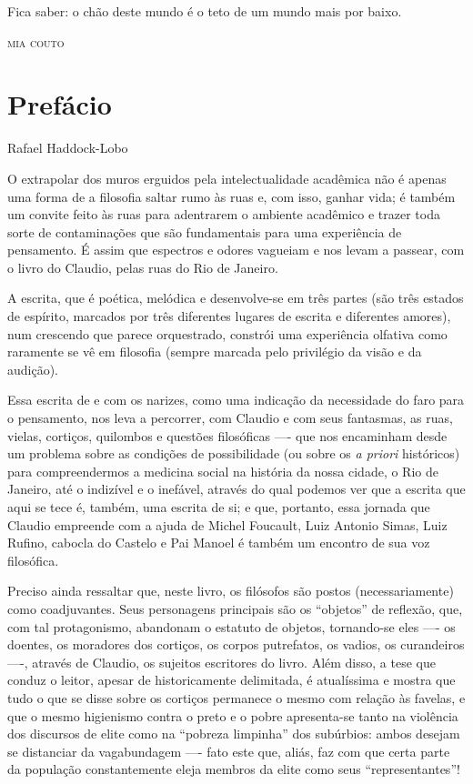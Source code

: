 \mbox{}
\thispagestyle{empty}
\vfill
\epigraph{Fica saber: o chão deste mundo é o teto de um mundo mais por baixo.}{\textsc{mia couto}}

\chapter{Prefácio}

\begin{flushright}
Rafael Haddock-Lobo
\end{flushright}

O extrapolar dos muros erguidos pela intelectualidade acadêmica não é
apenas uma forma de a filosofia saltar rumo às ruas e, com isso, ganhar
vida; é também um convite feito às ruas para adentrarem o ambiente
acadêmico e trazer toda sorte de contaminações que são fundamentais para
uma experiência de pensamento. É assim que espectros e odores vagueiam e
nos levam a passear, com o livro do Claudio, pelas ruas do Rio de
Janeiro.

A escrita, que é poética, melódica e desenvolve-se em três partes (são
três estados de espírito, marcados por três diferentes lugares de
escrita e diferentes amores), num crescendo que parece orquestrado,
constrói uma experiência olfativa como raramente se vê em filosofia
(sempre marcada pelo privilégio da visão e da audição).

Essa escrita de e com os narizes, como uma indicação da necessidade do
faro para o pensamento, nos leva a percorrer, com Claudio e com seus
fantasmas, as ruas, vielas, cortiços, quilombos e questões filosóficas
---- que nos encaminham desde um problema sobre as condições de
possibilidade (ou sobre os \textit{a priori} históricos) para
compreendermos a medicina social na história da nossa cidade, o Rio de
Janeiro, até o indizível e o inefável, através do qual podemos ver que a
escrita que aqui se tece é, também, uma escrita de si; e que, portanto,
essa jornada que Claudio empreende com a ajuda de Michel Foucault, Luiz
Antonio Simas, Luiz Rufino, cabocla do Castelo e Pai Manoel é também um
encontro de sua voz filosófica.

Preciso ainda ressaltar que, neste livro, os filósofos são postos
(necessariamente) como coadjuvantes. Seus personagens principais são os
``objetos'' de reflexão, que, com tal protagonismo, abandonam o estatuto
de objetos, tornando-se eles ---- os doentes, os moradores dos cortiços,
os corpos putrefatos, os vadios, os curandeiros ----, através de Claudio,
os sujeitos escritores do livro. Além disso, a tese que conduz o leitor,
apesar de historicamente delimitada, é atualíssima e mostra que tudo o
que se disse sobre os cortiços permanece o mesmo com relação às favelas,
e que o mesmo higienismo contra o preto e o pobre apresenta-se tanto na
violência dos discursos de elite como na ``pobreza limpinha'' dos
subúrbios: ambos desejam se distanciar da vagabundagem ---- fato este que,
aliás, faz com que certa parte da população constantemente eleja membros
da elite como seus ``representantes''!

